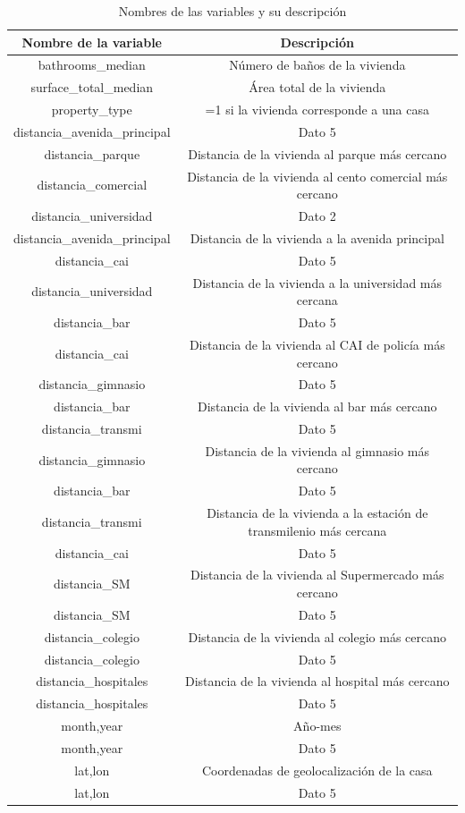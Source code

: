 \documentclass[
  11pt,
  letterpaper,
]{article}
\begin{document}
\begin{table}[ht]
\centering
\caption{Nombres de las variables y su descripción}
\begin{tabular}{|c|c|}
\hline
Nombre de la variable & Descripción  \\
\hline
\hline
bathrooms\_median & Número de baños de la vivienda \\
\hline
surface\_total\_median & Área total de la vivienda  \\
\hline
property\_type & =1 si la vivienda corresponde a una casa \\
distancia_avenida_principal & Dato 5 \\
\hline
distancia\_parque & Distancia de la vivienda al parque más cercano \\
\hline
distancia\_comercial & Distancia de la vivienda al cento comercial más cercano \\
distancia_universidad & Dato 2  \\
\hline
distancia\_avenida\_principal & Distancia de la vivienda a la avenida principal\\
distancia_cai & Dato 5 \\
\hline
distancia\_universidad & Distancia de la vivienda a la universidad más cercana \\
distancia_bar & Dato 5 \\
\hline
distancia\_cai & Distancia de la vivienda al CAI de policía más cercano \\
distancia_gimnasio & Dato 5 \\
\hline
distancia\_bar & Distancia de la vivienda al bar más cercano \\
distancia_transmi & Dato 5 \\
\hline
distancia\_gimnasio & Distancia de la vivienda al gimnasio más cercano \\
distancia_bar & Dato 5 \\
\hline
distancia\_transmi & Distancia de la vivienda a la estación de transmilenio más cercana \\
distancia_cai & Dato 5 \\
\hline
distancia\_SM & Distancia de la vivienda al Supermercado más cercano \\
distancia_SM & Dato 5 \\
\hline
distancia\_colegio & Distancia de la vivienda al colegio más cercano \\
distancia_colegio & Dato 5 \\
\hline
distancia\_hospitales & Distancia de la vivienda al hospital más cercano \\
distancia_hospitales & Dato 5 \\
\hline
month,year & Año-mes  \\
month,year & Dato 5 \\
\hline
lat,lon & Coordenadas de geolocalización de la casa \\
lat,lon & Dato 5 \\
\hline
\end{tabular}
\end{table}
\end{document}
